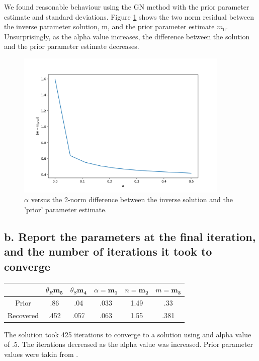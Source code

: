 \documentclass{article}
\begin{document}
We found reasonable behaviour using the GN method with the prior parameter estimate and standard deviations. Figure \ref{fig:alpha_m_prior} shows the two norm residual between the inverse parameter solution, m, and the prior parameter estimate $m_0$. Unsurprisingly, as the alpha value increases, the difference between the solution and the prior parameter estimate decreases.


\begin{figure}
    \centering
    \includegraphics[width=4in]{m_prior_alpha.png}
    \caption{$\alpha$ versus the 2-norm difference between the inverse solution and the 'prior' parameter estimate.}
    \label{fig:alpha_m_prior}
\end{figure}

\subsection*{b. \textbf{Report the parameters at the final iteration, and the number of iterations it took to converge}}
\begin{table}[!h]
\centering
\begin{tabular}{|c|c|c|c|c|c|}
\hline
& $\theta_R\mathbf{m_5}$ & $\theta_S \mathbf{m_4}$ & $\alpha = \mathbf{m_1}$ & $n = \mathbf{m_2}$ & $m = \mathbf{m_3}$ \\
\hline
Prior & .86 & .04 & .033 & 1.49 & .33 \\
Recovered & .452 & .057 & .063 & 1.55 & .381 \\
\hline
\end{tabular}
\end{table}


The solution took 425 iterations to converge to a solution using and alpha value of .5. The iterations decreased as the alpha value was increased. Prior parameter values were takin from \citet{hillel2005}.
\end{document}
